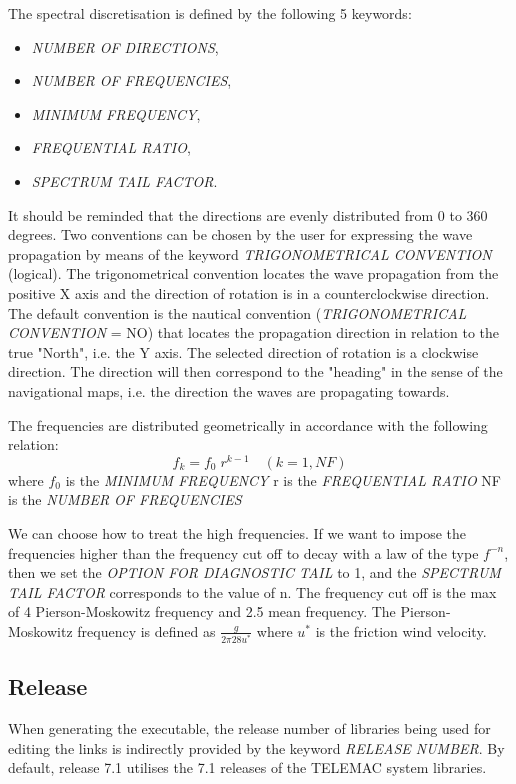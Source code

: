 The spectral discretisation is defined by the following 5 keywords:  
\begin{itemize} 
\item  \textit{NUMBER OF DIRECTIONS}, \item     \textit{NUMBER OF FREQUENCIES}, \item    \textit{MINIMUM FREQUENCY}, \item    \textit{FREQUENTIAL RATIO}, \item    \textit{SPECTRUM TAIL FACTOR}.
\end{itemize}
 It should be reminded that the directions are evenly distributed from 0 to 360 degrees. Two conventions can be chosen by the user for expressing the wave propagation by means of the keyword \textit{TRIGONOMETRICAL CONVENTION }(logical). The trigonometrical convention locates the wave propagation from the positive X axis and the direction of rotation is in a counterclockwise direction. The default convention is the nautical convention (\textit{TRIGONOMETRICAL CONVENTION} = NO) that locates the propagation direction in relation to the true "North", i.e. the Y axis. The selected direction of rotation is a clockwise direction. The direction will then correspond to the "heading" in the sense of the navigational maps, i.e. the direction the waves are propagating towards.

 The frequencies are distributed geometrically in accordance with the following relation:
\[f_{k} =f_{0} \; r^{k-1} \quad (k=1,NF)\]
where $f_{0} $ is the \textit{MINIMUM FREQUENCY }  r is the \textit{FREQUENTIAL RATIO}   NF is the \textit{NUMBER OF FREQUENCIES}

We can choose how to treat the high frequencies. If we want to impose the frequencies higher than the frequency cut off to decay with a law of the type $f^{-n}$, then we set the \textit{OPTION FOR DIAGNOSTIC TAIL} to 1, and the \textit{SPECTRUM TAIL FACTOR }corresponds to the value of n. The frequency cut off is the max of 4 Pierson-Moskowitz frequency and 2.5 mean frequency. 
The Pierson-Moskowitz frequency is defined as $\frac{g}{2\pi 28 u^*}$ where $ u^*$ is the friction wind velocity.  


\subsection{ Release}

 When generating the executable, the release number of libraries being used for editing the links is indirectly provided by the keyword \textit{\tomawac RELEASE NUMBER}. By default, \tomawac release 7.1 utilises the 7.1 releases of the TELEMAC system libraries.


